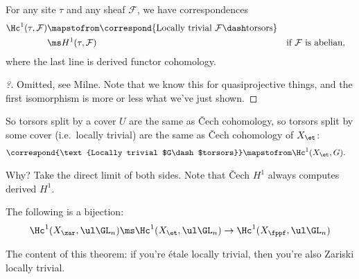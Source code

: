 \begin{proposition}[Identification of $H^1$]

For any site \(\tau\) and any sheaf \(\mathcal{F}\), we have
correspondences
\begin{align*}
\Hc^1(\tau, \mathcal{F})
&\mapstofrom
\correspond{\text{Locally trivial } \mathcal{F}\dash\text{torsors}} \\
&\ms H^1(\tau, \mathcal{F}) && \text{if $\mathcal{F}$ is abelian}
,\end{align*} where the last line is derived functor cohomology.

\end{proposition}

\begin{proof}[?]

Omitted, see Milne. Note that we know this for quasiprojective things,
and the first isomorphism is more or less what we've just shown.

\end{proof}

\begin{corollary}

So torsors split by a cover \(U\) are the same as Čech cohomology, so
torsors split by some cover (i.e.~locally trivial) are the same as Čech
cohomology of \(X_\et\):
\begin{align*}  
\correspond{\text{Locally trivial $G\dash$torsors}}
&\mapstofrom
\Hc^1(X_\et, G)
.\end{align*}

\end{corollary}

Why? Take the direct limit of both sides. Note that Čech \(H^1\) always
computes derived \(H^1\).

\begin{theorem}

The following is a bijection:
\begin{align*}  
\Hc^1(X_\zar, \ul \GL_n)
\ms
\Hc^1(X_\et, \ul \GL_n)
\to
\Hc^1(X_\fppf, \ul \GL_n)
\end{align*}

\end{theorem}

\begin{remark}

The content of this theorem: if you're étale locally trivial, then
you're also Zariski locally trivial.

\end{remark}


